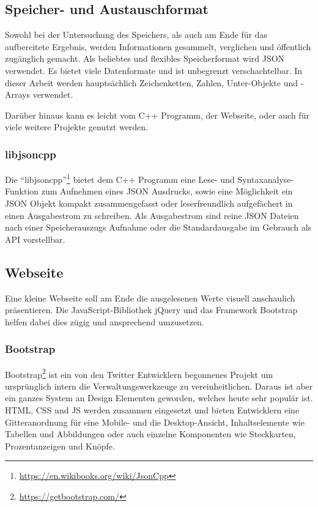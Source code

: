 \subsection{Speicher- und Austauschformat}
Sowohl bei der Untersuchung des Speichers, als auch am Ende für das aufbereitete Ergebnis, werden Informationen gesammelt, verglichen und öffentlich zugänglich gemacht.
Als beliebtes und flexibles Speicherformat wird \ac{JSON} verwendet.
Es bietet viele Datenformate und ist unbegrenzt verschachtelbar.
In dieser Arbeit werden hauptsächlich Zeichenketten, Zahlen, Unter-Objekte und -Arrays verwendet.

Darüber hinaus kann es leicht vom C++ Programm, der Webseite, oder auch für viele weitere Projekte genutzt werden.

\subsubsection{libjsoncpp}
Die "`libjsoncpp"'\footnote{\url{https://en.wikibooks.org/wiki/JsonCpp}} bietet dem C++ Programm eine Lese- und Syntaxanalyse-Funktion zum Aufnehmen eines \ac{JSON} Ausdrucks, sowie eine Möglichkeit ein \ac{JSON} Objekt kompakt zusammengefasst oder leserfreundlich aufgefächert in einen Ausgabestrom zu schreiben.
Als Ausgabestrom sind reine \ac{JSON} Dateien nach einer Speicherauszugs Aufnahme oder die Standardausgabe im Gebrauch als API vorstellbar.


\subsection{Webseite}
Eine kleine Webseite soll am Ende die ausgelesenen Werte visuell anschaulich präsentieren.
Die JavaScript-Bibliothek jQuery und das Framework Bootstrap helfen dabei dies zügig und ansprechend umzusetzen.

\subsubsection{Bootstrap}
Bootstrap\footnote{\url{https://getbootstrap.com/}} ist ein von den Twitter Entwicklern begonnenes Projekt um ursprünglich intern die Verwaltungswerkzeuge zu vereinheitlichen.
Daraus ist aber ein ganzes System an Design Elementen geworden, welches heute sehr populär ist.
\ac{HTML}, \ac{CSS} und \ac{JS} werden zusammen eingesetzt und bieten Entwicklern eine Gitteranordnung für eine Mobile- und die Desktop-Ansicht, Inhaltselemente wie Tabellen und Abbildungen oder auch einzelne Komponenten wie Steckkarten, Prozentanzeigen und Knöpfe.

